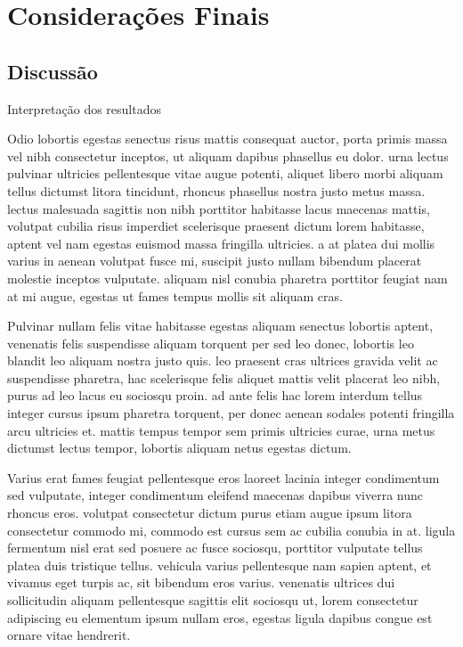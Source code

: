 \section{Considerações Finais}

\subsection{Discussão}

Interpretação dos resultados

Odio lobortis egestas senectus risus mattis consequat auctor, porta primis massa vel nibh consectetur inceptos, ut aliquam dapibus phasellus eu dolor. urna lectus pulvinar ultricies pellentesque vitae augue potenti, aliquet libero morbi aliquam tellus dictumst litora tincidunt, rhoncus phasellus nostra justo metus massa. lectus malesuada sagittis non nibh porttitor habitasse lacus maecenas mattis, volutpat cubilia risus imperdiet scelerisque praesent dictum lorem habitasse, aptent vel nam egestas euismod massa fringilla ultricies. a at platea dui mollis varius in aenean volutpat fusce mi, suscipit justo nullam bibendum placerat molestie inceptos vulputate. aliquam nisl conubia pharetra porttitor feugiat nam at mi augue, egestas ut fames tempus mollis sit aliquam cras. 

Pulvinar nullam felis vitae habitasse egestas aliquam senectus lobortis aptent, venenatis felis suspendisse aliquam torquent per sed leo donec, lobortis leo blandit leo aliquam nostra justo quis. leo praesent cras ultrices gravida velit ac suspendisse pharetra, hac scelerisque felis aliquet mattis velit placerat leo nibh, purus ad leo lacus eu sociosqu proin. ad ante felis hac lorem interdum tellus integer cursus ipsum pharetra torquent, per donec aenean sodales potenti fringilla arcu ultricies et. mattis tempus tempor sem primis ultricies curae, urna metus dictumst lectus tempor, lobortis aliquam netus egestas dictum.

Varius erat fames feugiat pellentesque eros laoreet lacinia integer condimentum sed vulputate, integer condimentum eleifend maecenas dapibus viverra nunc rhoncus eros. volutpat consectetur dictum purus etiam augue ipsum litora consectetur commodo mi, commodo est cursus sem ac cubilia conubia in at. ligula fermentum nisl erat sed posuere ac fusce sociosqu, porttitor vulputate tellus platea duis tristique tellus. vehicula varius pellentesque nam sapien aptent, et vivamus eget turpis ac, sit bibendum eros varius. venenatis ultrices dui sollicitudin aliquam pellentesque sagittis elit sociosqu ut, lorem consectetur adipiscing eu elementum ipsum nullam eros, egestas ligula dapibus congue est ornare vitae hendrerit. 


